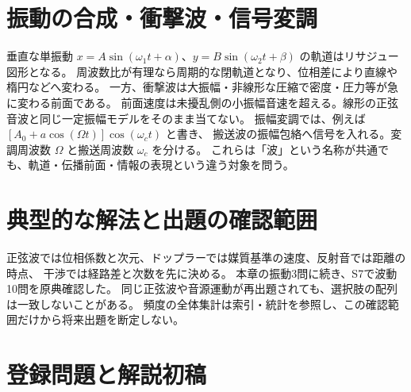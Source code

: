 \section{振動の合成・衝撃波・信号変調}\label{theory:wave:applications}
垂直な単振動 \(x=A\sin(\omega_1t+\alpha)\)、\(y=B\sin(\omega_2t+\beta)\) の軌道はリサジュー図形となる。
周波数比が有理なら周期的な閉軌道となり、位相差により直線や楕円などへ変わる。
一方、衝撃波は大振幅・非線形な圧縮で密度・圧力等が急に変わる前面である。
前面速度は未擾乱側の小振幅音速を超える。線形の正弦音波と同じ一定振幅モデルをそのまま当てない。
振幅変調では、例えば \([A_0+a\cos(\Omega t)]\cos(\omega_ct)\) と書き、
搬送波の振幅包絡へ信号を入れる。変調周波数 \(\Omega\) と搬送周波数 \(\omega_c\) を分ける。
これらは「波」という名称が共通でも、軌道・伝播前面・情報の表現という違う対象を問う。

\section{典型的な解法と出題の確認範囲}
正弦波では位相係数と次元、ドップラーでは媒質基準の速度、反射音では距離の時点、
干渉では経路差と次数を先に決める。
本章の振動3問に続き、S7で波動10問を原典確認した。
同じ正弦波や音源運動が再出題されても、選択肢の配列は一致しないことがある。
頻度の全体集計は索引・統計を参照し、この確認範囲だけから将来出題を断定しない。

\section{登録問題と解説初稿}

